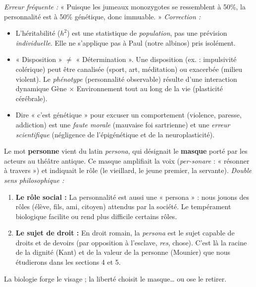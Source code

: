 \documentclass[11pt]{article}
\newcommand{\cle}[1]{{\popxbold\color{popdark}#1}}
\begin{document}
\begin{attention}
\emph{Erreur fréquente :} « Puisque les jumeaux monozygotes se ressemblent à 50\%, la personnalité est à 50\% génétique, donc immuable. »
\emph{Correction :}
\begin{itemize}
    \item L'héritabilité ($h^2$) est une statistique de \emph{population}, pas une prévision \emph{individuelle}. Elle ne s'applique pas à Paul (notre albinos) pris isolément.
    \item « Disposition » $\neq$ « Détermination ». Une disposition (ex. : impulsivité colérique) peut être canalisée (sport, art, méditation) ou exacerbée (milieu violent). Le \emph{phénotype} (personnalité observable) résulte d'une interaction dynamique Gène $\times$ Environnement tout au long de la vie (plasticité cérébrale).
    \item Dire « c'est génétique » pour excuser un comportement (violence, paresse, addiction) est une \emph{faute morale} (mauvaise foi sartrienne) et une \emph{erreur scientifique} (négligence de l'épigénétique et de la neuroplasticité).
\end{itemize}
\end{attention}

\begin{savaistu}
Le mot \textbf{personne} vient du latin \emph{persona}, qui désignait le \textbf{masque} porté par les acteurs au théâtre antique. Ce masque amplifiait la voix (\emph{per-sonare} : « résonner à travers ») et indiquait le rôle (le vieillard, le jeune premier, la servante).
\emph{Double sens philosophique :}
\begin{enumerate}
    \item \textbf{Le rôle social :} La personnalité est aussi une « persona » : nous jouons des rôles (élève, fils, ami, citoyen) attendus par la société. Le tempérament biologique facilite ou rend plus difficile certains rôles.
    \item \textbf{Le sujet de droit :} En droit romain, la \emph{persona} est le sujet capable de droits et de devoirs (par opposition à l'esclave, \emph{res}, chose). C'est là la racine de la \cle{dignité} (Kant) et de la \cle{valeur de la personne} (Mounier) que nous étudierons dans les sections 4 et 5.
\end{enumerate}
La biologie forge le visage ; la liberté choisit le masque… ou ose le retirer.
\end{savaistu}
\end{document}
